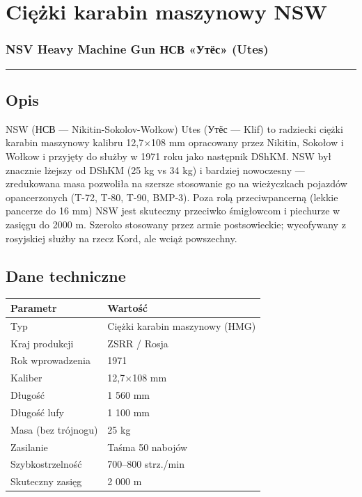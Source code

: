 \documentclass[12pt,openany,oneside]{book}
\begin{document}
\chapter{Ciężki karabin maszynowy
NSW}\label{ciux119ux17cki-karabin-maszynowy-nsw}

\subsection{NSV Heavy Machine Gun \textbar{} НСВ «Утёс»
(Utes)}\label{nsv-heavy-machine-gun-ux43dux441ux432-ux443ux442ux451ux441-utes}

\begin{center}\rule{0.5\linewidth}{0.5pt}\end{center}

\section{Opis}\label{opis-59}

NSW (НСВ --- Nikitin-Sokolov-Wołkow) Utes (Утёс --- Klif) to radziecki
ciężki karabin maszynowy kalibru 12,7×108 mm opracowany przez Nikitin,
Sokołow i Wołkow i przyjęty do służby w 1971 roku jako następnik DShKM.
NSW był znacznie lżejszy od DShKM (25 kg vs 34 kg) i bardziej nowoczesny
--- zredukowana masa pozwoliła na szersze stosowanie go na wieżyczkach
pojazdów opancerzonych (T-72, T-80, T-90, BMP-3). Poza rolą
przeciwpancerną (lekkie pancerze do 16 mm) NSW jest skuteczny przeciwko
śmigłowcom i piechurze w zasięgu do 2000 m. Szeroko stosowany przez
armie postsowieckie; wycofywany z rosyjskiej służby na rzecz Kord, ale
wciąż powszechny.

\section{Dane techniczne}\label{dane-techniczne-59}

\begin{longtable}[]{@{}ll@{}}
\toprule\noalign{}
Parametr & Wartość \\
\midrule\noalign{}
\endhead
\bottomrule\noalign{}
\endlastfoot
Typ & Ciężki karabin maszynowy (HMG) \\
Kraj produkcji & ZSRR / Rosja \\
Rok wprowadzenia & 1971 \\
Kaliber & 12,7×108 mm \\
Długość & 1 560 mm \\
Długość lufy & 1 100 mm \\
Masa (bez trójnogu) & 25 kg \\
Zasilanie & Taśma 50 nabojów \\
Szybkostrzelność & 700--800 strz./min \\
Skuteczny zasięg & 2 000 m \\
\end{longtable}
\end{document}

